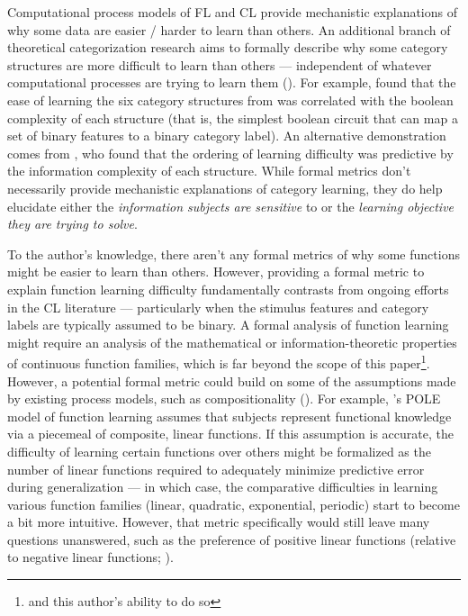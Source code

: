 \documentclass[12pt]{article}
\let\oldcite=\cite
\let\oldtextcite=\textcite
\renewcommand{\cite}[1]{\textcolor[rgb]{0, .121, .388}{\oldcite{#1}}}
\renewcommand{\textcite}[1]{\textcolor[rgb]{0, .121, .388}{\oldtextcite{#1}}}
\begin{document}
Computational process models of FL and CL provide mechanistic explanations of why some data are easier / harder to learn than others. An additional branch of theoretical categorization research aims to formally describe why some category structures are more difficult to learn than others --- independent of whatever computational processes are trying to learn them (\cite{pape2015complexity}). For example, \textcite{feldman2000minimization} found that the ease of learning the six category structures from \textcite{shepard1961learning} was correlated with the boolean complexity of each structure (that is, the simplest boolean circuit that can map a set of binary features to a binary category label). An alternative demonstration comes from \textcite{pape2015complexity}, who found that the ordering of learning difficulty was predictive by the information complexity of each structure. While formal metrics don't necessarily provide mechanistic explanations of category learning, they do help elucidate either the \emph{information subjects are sensitive} to or the \emph{learning objective they are trying to solve}.

To the author's knowledge, there aren't any formal metrics of why some functions might be easier to learn than others. However, providing a formal metric to explain function learning difficulty fundamentally contrasts from ongoing efforts in the CL literature --- particularly when the stimulus features and category labels are typically assumed to be binary. A formal analysis of function learning might require an analysis of the mathematical or information-theoretic properties of continuous function families, which is far beyond the scope of this paper\footnote{and this author's ability to do so}. However, a potential formal metric could build on some of the assumptions made by existing process models, such as compositionality (\cite{schulz2017compositional}). For example, \textcite{kalish2004population}'s POLE model of function learning assumes that subjects represent functional knowledge via a piecemeal of composite, linear functions. If this assumption is accurate, the difficulty of learning certain functions over others might be formalized as the number of linear functions required to adequately minimize predictive error during generalization --- in which case, the comparative difficulties in learning various function families (linear, quadratic, exponential, periodic) start to become a bit more intuitive. However, that metric specifically would still leave many questions unanswered, such as the preference of positive linear functions (relative to negative linear functions; \cite{naylor1968intuitive,brehmer1974hypotheses}).
\end{document}
